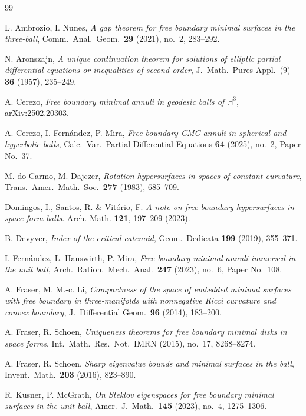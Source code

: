 \documentclass[11pt,a4paper]{amsart}
\theoremstyle{plain}
\theoremstyle{definition}
\newcommand{\Hyp}{\mathbb{H}}
\begin{document}
\begin{thebibliography}{99}

 L. Ambrozio, I. Nunes, \emph{A gap theorem for free boundary minimal surfaces in the three-ball}, Comm.\ Anal.\ Geom.\ \textbf{29} (2021), no.\ 2, 283--292.

 N. Aronszajn, \emph{A unique continuation theorem for solutions of elliptic partial differential equations or inequalities of second order}, J.\ Math.\ Pures Appl.\ (9) \textbf{36} (1957), 235--249.

 A. Cerezo, \emph{Free boundary minimal annuli in geodesic balls of $\Hyp^3$}, arXiv:2502.20303.

 A. Cerezo, I. Fern\'andez, P. Mira, \emph{Free boundary CMC annuli in spherical and hyperbolic balls}, Calc.\ Var.\ Partial Differential Equations \textbf{64} (2025), no.\ 2, Paper No.\ 37.

 M. do Carmo, M. Dajczer, \emph{Rotation hypersurfaces in spaces of constant curvature}, Trans.\ Amer.\ Math.\ Soc.\ \textbf{277} (1983), 685--709.

 Domingos, I., Santos, R. \& Vitório, F. \emph{A note on free boundary hypersurfaces in space form balls}. Arch. Math. \textbf{121}, 197–209 (2023). 

 B. Devyver, \emph{Index of the critical catenoid}, Geom.\ Dedicata \textbf{199} (2019), 355--371.

 I. Fern\'andez, L. Hauswirth, P. Mira, \emph{Free boundary minimal annuli immersed in the unit ball}, Arch.\ Ration.\ Mech.\ Anal.\ \textbf{247} (2023), no.\ 6, Paper No.\ 108.

 A. Fraser, M. M.-c. Li, \emph{Compactness of the space of embedded minimal surfaces with free boundary in three-manifolds with nonnegative Ricci curvature and convex boundary}, J.\ Differential Geom.\ \textbf{96} (2014), 183--200.

 A. Fraser, R. Schoen, \emph{Uniqueness theorems for free boundary minimal disks in space forms}, Int.\ Math.\ Res.\ Not.\ IMRN (2015), no.\ 17, 8268--8274.

 A. Fraser, R. Schoen, \emph{Sharp eigenvalue bounds and minimal surfaces in the ball}, Invent.\ Math.\ \textbf{203} (2016), 823--890.

 R. Kusner, P. McGrath, \emph{On Steklov eigenspaces for free boundary minimal surfaces in the unit ball}, Amer.\ J.\ Math.\ \textbf{145} (2023), no.\ 4, 1275--1306.


\end{thebibliography}
\end{document}
